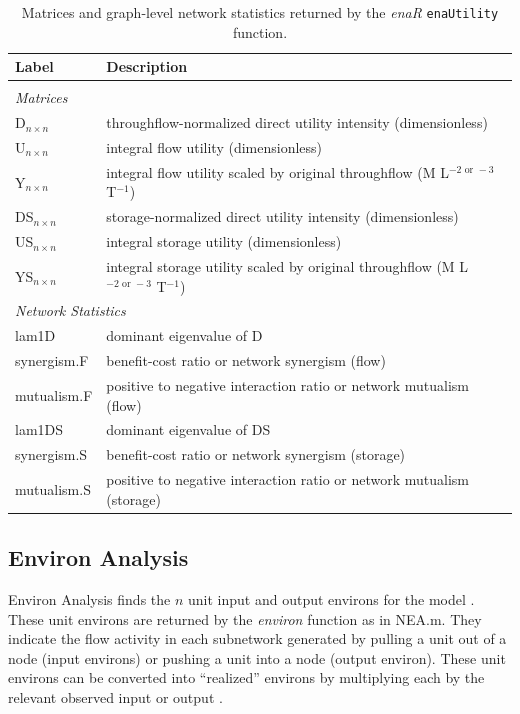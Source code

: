 \documentclass[article]{jss}
\begin{document}
\begin{table}[t]
  \caption{Matrices and graph-level network statistics returned by the \textit{enaR}
    \texttt{enaUtility} function.}\label{tab:utility}                  %
\center
\begin{small}
  \begin{tabularx}{\textwidth}{l l}
    \textbf{Label} & \textbf{Description} \\ \hline \\[-1.5ex]
    \multicolumn{2}{l}{\textit{Matrices}} \\[1ex]
    D$_{n\times n}$ & throughflow-normalized direct utility intensity (dimensionless)\\
    U$_{n\times n}$ & integral flow utility (dimensionless) \\
    Y$_{n\times n}$ & integral flow utility scaled by original throughflow (M L$^{-2 \textrm{ or } -3}$ T$^{-1}$)\\
    DS$_{n\times n}$ & storage-normalized direct utility intensity (dimensionless)\\
    US$_{n\times n}$ & integral storage utility (dimensionless) \\
    YS$_{n\times n}$ & integral storage utility scaled by original throughflow (M L$^{-2  \textrm{ or }  -3}$ T$^{-1}$)\\ [1ex]
    \multicolumn{2}{l}{\textit{Network Statistics}} \\[1ex]
    lam1D & dominant eigenvalue of D\\
    synergism.F & benefit-cost ratio or network synergism (flow)\\
    mutualism.F & positive to negative interaction ratio or network mutualism (flow)\\
    lam1DS & dominant eigenvalue of DS\\
    synergism.S & benefit-cost ratio or network synergism (storage) \\
    mutualism.S & positive to negative interaction ratio or network mutualism (storage)\\ \hline
\end{tabularx}
\end{small}
\end{table}

\subsection{Environ Analysis}
Environ Analysis finds the $n$ unit input and output environs
for the model \citep{patten78,fath99_review}.  These unit environs are
returned by the \textit{environ} function as in NEA.m.  They indicate the flow
activity in each subnetwork generated by pulling a unit out of a node
(input environs) or pushing a unit into a node (output environ). These
unit environs can be converted into ``realized'' environs by
multiplying each by the relevant observed input or output
\citep{borrett11_ree, whipple07, whipple2014}.
\end{document}
